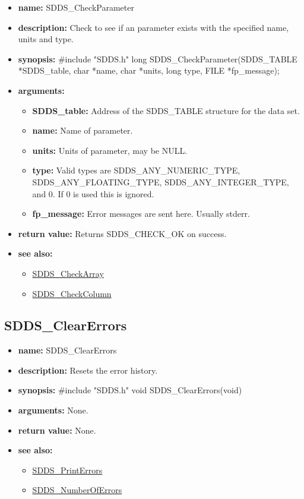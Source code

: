 \documentclass[11pt]{article}
\newcommand{\progref}[1]{\hyperref{SDDS_#1}{{\tt SDDS\_#1} (}{)}{SDDS_#1}}
\begin{document}
\begin{itemize}
\item {\bf name:}\newline
SDDS\_CheckParameter
\item {\bf description:}\newline
Check to see if an parameter exists with the specified name, units and type.
\item {\bf synopsis:} \#include "SDDS.h"\newline
long SDDS\_CheckParameter(SDDS\_TABLE *SDDS\_table, char *name, char *units, long type, FILE *fp\_message);
\item {\bf arguments:}
\begin{itemize}
\item {\bf SDDS\_table:} Address of the SDDS\_TABLE structure for the data set.
\item {\bf name:} Name of parameter.
\item {\bf units:} Units of parameter, may be NULL.
\item {\bf type:} Valid types are SDDS\_ANY\_NUMERIC\_TYPE, SDDS\_ANY\_FLOATING\_TYPE, SDDS\_ANY\_INTEGER\_TYPE, and 0. If 0 is used this is ignored.
\item {\bf fp\_message:} Error messages are sent here. Usually stderr.
\end{itemize}
\item {\bf return value:}\newline
Returns SDDS\_CHECK\_OK on success.
\item {\bf see also:}
\begin{itemize}
\item \progref{CheckArray}
\item \progref{CheckColumn}
\end{itemize}
\end{itemize}

\subsection{SDDS\_ClearErrors}
\label{SDDS_ClearErrors}

\begin{itemize}
\item {\bf name:}\newline
SDDS\_ClearErrors
\item {\bf description:}\newline
Resets the error history.
\item {\bf synopsis:} \#include "SDDS.h"\newline
void SDDS\_ClearErrors(void)
\item {\bf arguments:}\newline
None.
\item {\bf return value:}\newline
None.
\item {\bf see also:}
\begin{itemize}
\item \progref{PrintErrors}
\item \progref{NumberOfErrors}
\end{itemize}
\end{itemize}
\end{document}

